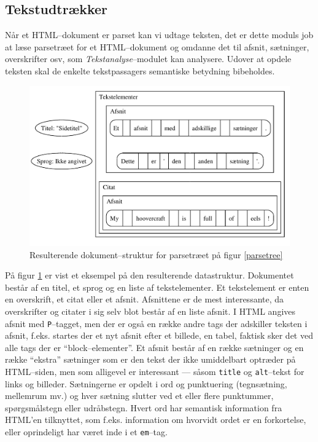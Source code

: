 \documentclass[a4paper,oneside,article]{memoir}
\begin{document}
\subsection{Tekstudtrækker}
Når et HTML--dokument er parset kan vi udtage teksten, det er dette
moduls job at læse parsetræet for et HTML--dokument og omdanne det til
afsnit, sætninger, overskrifter osv, som \textit{Tekstanalyse}--modulet
kan analysere. Udover at opdele teksten skal de enkelte tekstpassagers
semantiske betydning bibeholdes.

\begin{figure}
  \includegraphics[width=\textwidth]{documentill.pdf}
  \caption{Resulterende dokument--struktur for parsetræet på figur
    \ref{parsetree}}
  \label{dokument}
\end{figure}

På figur \ref{dokument} er vist et eksempel på den resulterende
datastruktur. Dokumentet består af en titel, et sprog og en liste af
tekstelementer. Et tekstelement er enten en overskrift, et citat eller
et afsnit. Afsnittene er de mest interessante, da overskrifter og
citater i sig selv blot består af en liste afsnit. I HTML angives
afsnit med \texttt{P}--tagget, men der er også en række andre tags der
adskiller teksten i afsnit, f.eks. startes der et nyt afsnit efter et
billede, en tabel, faktisk sker det ved alle tags der er
``block--elementer''. Et afsnit består af en række sætninger og en
række ``ekstra'' sætninger som er den tekst der ikke umiddelbart
optræder på HTML--siden, men som alligevel er interessant --- såsom
\texttt{title} og \texttt{alt}--tekst for links og
billeder. Sætningerne er opdelt i ord og punktuering (tegnsætning,
mellemrum mv.) og hver sætning slutter ved et eller flere punktummer,
spørgsmålstegn eller udråbstegn. Hvert ord har semantisk
information fra HTML'en tilknyttet, som f.eks. information om hvorvidt
ordet er en forkortelse, eller oprindeligt har været inde i et
\texttt{em}--tag.
\end{document}
